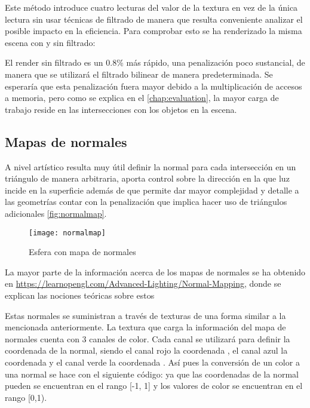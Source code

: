 Este método introduce cuatro lecturas del valor de la textura en vez de la única lectura sin usar técnicas de filtrado de manera que resulta conveniente analizar el posible impacto en la eficiencia. Para comprobar esto se ha renderizado la misma escena con y sin filtrado:

		

	
El render sin filtrado es un 0.8\% más rápido, una penalización poco sustancial, de manera que se utilizará el filtrado bilinear de manera predeterminada. Se esperaría que esta penalización fuera mayor debido a la multiplicación de accesos a memoria, pero como se explica en el \autoref{chap:evaluation}, la mayor carga de trabajo reside en las intersecciones con los objetos en la escena.
	
\subsection{Mapas de normales}
		
A nivel artístico resulta muy útil definir la normal para cada intersección en un triángulo de manera arbitraria, aporta control sobre la dirección en la que luz incide en la superficie además de que permite dar mayor complejidad y detalle a las geometrías contar con la penalización que implica hacer uso de triángulos adicionales \autoref{fig:normalmap}. 
	
		
\begin{figure}[H]
    \centering
	\texttt{[image: normalmap]}
	\caption{Esfera con mapa de normales}
	\label{fig:normalmap}
\end{figure}

	
La mayor parte de la información acerca de los mapas de normales se ha obtenido en \url{https://learnopengl.com/Advanced-Lighting/Normal-Mapping}, donde se explican las nociones teóricas sobre estos
	
Estas normales se suministran a través de texturas de una forma similar a la mencionada anteriormente. La textura que carga la información del mapa de normales cuenta con 3 canales de color. Cada canal se utilizará para definir la coordenada de la normal, siendo el canal rojo la coordenada , el canal azul la coordenada  y el canal verde la coordenada . Así pues la conversión de un color a una normal se hace con el siguiente código:  ya que las coordenadas de la normal pueden se encuentran en el rango [-1, 1] y los valores de color se encuentran en el rango [0,1).
	
